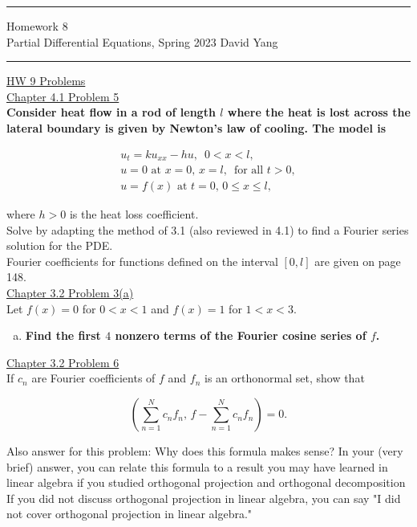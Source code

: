 \documentclass[11pt]{article}
\begin{document}
	\hrule
	\begin{center}
		{\Large Homework 8} \\ %
		\vspace{0.2cm}
		Partial Differential Equations, Spring 2023 \hfill David Yang %
	\end{center}

\hrule

\vspace{1em}


\underline{HW 9 Problems} \\

\underline{Chapter 4.1 Problem 5} \\

\textbf{Consider heat flow in a rod of length $l$ where the heat is lost across the lateral boundary is given by Newton's law of cooling. The model is} 

\[
\begin{array}{c}
    u_t = ku_{xx} - hu, \,\,\, 0 < x < l, \\
    u = 0 \text{ at } x =0, \, x=l, \, \text{ for all } t > 0,\\
    u = f(x) \text { at } t=0, \, 0 \leq x \leq l,
\end{array}
\]

where $h > 0$ is the heat loss coefficient. \\

Solve by adapting the method of 3.1 (also reviewed in 4.1) to find a Fourier series solution for the PDE. \\

Fourier coefficients for functions defined on the interval $[0, l]$ are given on page 148. \\

\underline{Chapter 3.2 Problem 3(a)} \\

Let $f(x)=0$ for $0<x<1$ and $f(x)=1$ for $1<x<3$. 
\begin{enumerate}[a)] 
    \item \textbf{Find the first $4$ nonzero terms of the Fourier cosine series of $f$.}
\end{enumerate}

\underline{Chapter 3.2 Problem 6} \\

If $c_n$ are Fourier coefficients of $f$ and $f_n$ is an orthonormal set, show that

\[ \left(\sum\limits_{n=1}^N c_n f_n, \, f  - \sum\limits_{n=1}^N c_nf_n \right) = 0.\]

Also answer for this problem: Why does this formula makes sense?
In your (very brief) answer, you can relate this formula to a result you may have learned
in linear algebra if you studied orthogonal projection and orthogonal decomposition
If you did not discuss orthogonal projection in linear algebra, you can say "I did not
cover orthogonal projection in linear algebra."
\end{document}
